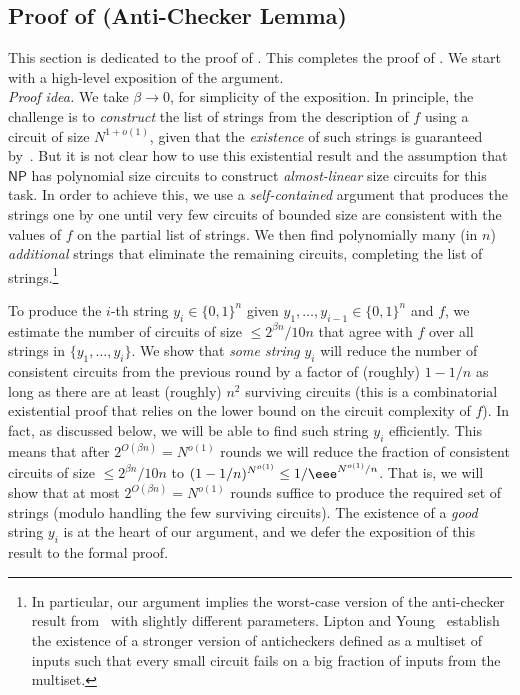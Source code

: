 \documentclass{toc}
\begin{document}
\subsection{Proof of  (Anti-Checker Lemma)}\label{ss:antichecker_lemma}

This section is dedicated to the proof of . This completes the proof of . We start with a high-level exposition of the argument.\\

\noindent \emph{Proof  idea.} We take $\beta \to 0$, for simplicity of the exposition.
In principle, the challenge is to \emph{construct} the list of strings from the description of $f$ using a circuit of size $N^{1 + o(1)}$, given that the \emph{existence} of such strings is guaranteed %
%
%
by~\cite{DBLP:conf/stoc/LiptonY94}.
%
%
But it is not clear how to use this existential result and the assumption that $\mathsf{NP}$ has polynomial size circuits to construct \emph{almost-linear} size circuits for this task. In order to achieve this, we use a \emph{self-contained} argument that produces the strings one by one until very few circuits of bounded size are consistent with the values of $f$ on the partial list of strings. We then find polynomially many (in $n$) \emph{additional} strings that eliminate the remaining circuits, completing the list of strings.\footnote{In particular, our argument implies the worst-case version of the anti-checker result from~\cite{DBLP:conf/stoc/LiptonY94} with slightly different parameters. Lipton and Young~\cite{DBLP:conf/stoc/LiptonY94} establish the existence of a stronger version of anticheckers defined as a multiset of inputs such that every small circuit fails on a big fraction of inputs from the multiset.}

To produce the $i$-th string $y_i \in \{0,1\}^n$ given $y_1, \ldots, y_{i-1} \in \{0,1\}^n$ and $f$, we estimate the number of circuits of size $\leq 2^{\beta n}/10n$ that agree with $f$ over all strings in $\{y_1, \ldots, y_i\}$. We show that \emph{some string} $y_i$ will reduce the number of consistent circuits from the previous round by a factor of (roughly) $1 - 1/n$ as long as there are at least (roughly) $n^2$ surviving circuits (this is a combinatorial existential proof that relies on the lower bound on the circuit complexity of $f$). In fact, as discussed below, we will be able to find such string $y_i$ efficiently. This means that after $2^{O(\beta n)}=N^{o(1)}$ rounds we will reduce the fraction of consistent circuits of size $\leq 2^{\beta n}/10n$ to $(1-1/n)^{N^{o(1)}}\le 1/\eee^{N^{o(1)}/n}$. That is, we will 
show that at most $2^{O(\beta n)} = N^{o(1)}$ rounds suffice to produce the required set of strings (modulo handling the few surviving circuits). The existence of a \emph{good} string $y_i$ is at the heart of our argument, and we defer the exposition of this result to the formal proof.
\end{document}
